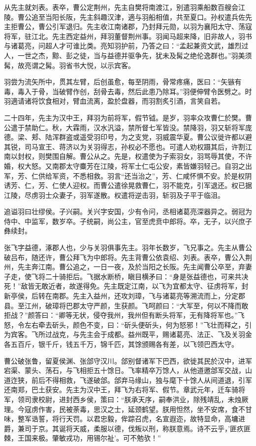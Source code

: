 \documentclass[12pt,UTF8]{ctexbook}
\begin{document}
从先主就刘表。表卒，曹公定荆州，先主自樊将南渡江，别遣羽乘船数百艘会江陵。曹公追至当阳长阪，先主斜趣汉津，適与羽船相值，共至夏口。孙权遣兵佐先主拒曹公，曹公引军退归。先主收江南诸郡，乃封拜元勋，以羽为襄阳太守、荡寇将军，驻江北。先主西定益州，拜羽董督荆州事。羽闻马超来降，旧非故人，羽书与诸葛亮，问超人才可谁比类。亮知羽护前，乃答之曰：“孟起兼资文武，雄烈过人，一世之杰，黥、彭之徒，当与益德并驱争先，犹未及髯之绝伦逸群也。”羽美须髯，故亮谓之髯。羽省书大悦，以示宾客。

羽尝为流矢所中，贯其左臂，后创虽愈，每至阴雨，骨常疼痛，医曰：“矢镞有毒，毒入于骨，当破臂作创，刮骨去毒，然后此患乃除耳。”羽便伸臂令医劈之。时羽適请诸将饮食相对，臂血流离，盈於盘器，而羽割炙引酒，言笑自若。

二十四年，先主为汉中王，拜羽为前将军，假节钺。是岁，羽率众攻曹仁於樊。曹公遣于禁助仁。秋，大霖雨，汉水汎溢，禁所督七军皆没。禁降羽，羽又斩将军庞德。梁、郏、陆浑群盗或遥受羽印号，为之支党，羽威震华夏。曹公议徙许都以避其锐，司马宣王、蒋济以为关羽得志，孙权必不愿也。可遣人劝权蹑其后，许割江南以封权，则樊围自解。曹公从之。先是，权遣使为子索羽女，羽骂辱其使，不许婚，权大怒。又南郡太守麋芳在江陵，将军士仁屯公安，素皆嫌羽轻己。自羽之出军，芳、仁供给军资，不悉相救。羽言“还当治之”，芳、仁咸怀惧不安。於是权阴诱芳、仁，芳、仁使人迎权。而曹公遣徐晃救曹仁，羽不能克，引军退还。权已据江陵，尽虏羽士众妻子，羽军遂散。权遣将逆击羽，斩羽及子平于临沮。

追谥羽曰壮缪侯。子兴嗣。关兴字安国，少有令问，丞相诸葛亮深器异之。弱冠为侍中、中监军，数岁卒。子统嗣，尚公主，官至虎贲中郎将。卒，无子，以兴庶子彝续封。

张飞字益德，涿郡人也，少与关羽俱事先主。羽年长数岁，飞兄事之。先主从曹公破吕布，随还许，曹公拜飞为中郎将。先主背曹公依袁绍、刘表。表卒，曹公入荆州，先主奔江南。曹公追之，一日一夜，及於当阳之长阪。先主闻曹公卒至，弃妻子走，使飞将二十骑拒后。飞据水断桥，瞋目横矛曰：“身是张益德也，可来共决死！”敌皆无敢近者，故遂得免。先主既定江南，以飞为宜都太守、征虏将军，封新亭侯，后转在南郡。先主入益州，还攻刘璋，飞与诸葛亮等溯流而上，分定郡县。至江州，破璋将巴郡太守严颜，生获颜。飞呵颜曰：“大军至，何以不降而敢拒战？”颜答曰：“卿等无状，侵夺我州，我州但有断头将军，无有降将军也。”飞怒，令左右牵去斫头，颜色不变，曰：“斫头便斫头，何为怒邪！”飞壮而释之，引为宾客。飞所过战克，与先主会于成都。益州既平，赐诸葛亮、法正、飞及关羽金各五百斤，银千斤，钱五千万，锦千匹，其馀颁赐各有差，以飞领巴西太守。

曹公破张鲁，留夏侯渊、张郃守汉川。郃别督诸军下巴西，欲徙其民於汉中，进军宕渠、蒙头、荡石，与飞相拒五十馀日。飞率精卒万馀人，从他道邀郃军交战，山道迮狭，前后不得相救，飞遂破郃。郃弃马缘山，独与麾下十馀人从间道退，引军还南郑，巴土获安。先主为汉中王，拜飞为右将军、假节。章武元年，迁车骑将军，领司隶校尉，进封西乡侯，策曰：“朕承天序，嗣奉洪业，除残靖乱，未烛厥理。今寇虏作害，民被荼毒，思汉之士，延颈鹤望。朕用怛然，坐不安席，食不甘味，整军诰誓，将行天罚。以君忠毅，侔踪召虎，名宣遐迩，故特显命，高墉进爵，兼司于京。其诞将天威，柔服以德，伐叛以刑，称朕意焉。诗不云乎，'匪疚匪棘，王国来极。肇敏戎功，用锡尔祉'。可不勉欤！”
\end{document}
